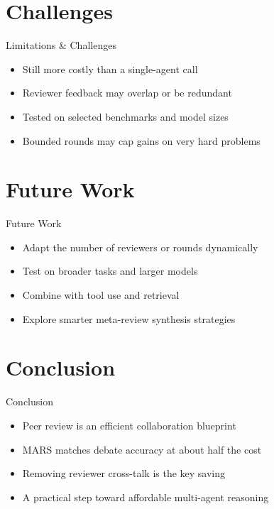 \documentclass[10pt]{beamer}
\begin{document}
\section{Challenges}
\begin{frame}{Limitations \& Challenges}
\begin{itemize}
  \item Still more costly than a single-agent call
  \item Reviewer feedback may overlap or be redundant
  \item Tested on selected benchmarks and model sizes
  \item Bounded rounds may cap gains on very hard problems
\end{itemize}
\end{frame}

\section{Future Work}
\begin{frame}{Future Work}
\begin{itemize}
  \item Adapt the number of reviewers or rounds dynamically
  \item Test on broader tasks and larger models
  \item Combine with tool use and retrieval
  \item Explore smarter meta-review synthesis strategies
\end{itemize}
\end{frame}

\section{Conclusion}
\begin{frame}{Conclusion}
\begin{itemize}
  \item Peer review is an efficient collaboration blueprint
  \item MARS matches debate accuracy at about half the cost
  \item Removing reviewer cross-talk is the key saving
  \item A practical step toward affordable multi-agent reasoning
\end{itemize}
\end{frame}
\end{document}
